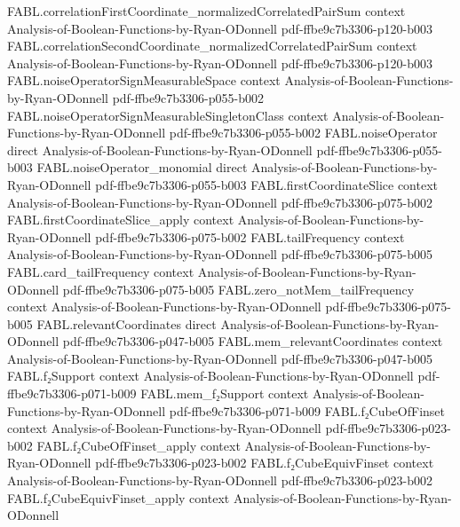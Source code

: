 \begin{theorem}
\proofstep
  {FABL.correlationFirstCoordinate_normalizedCorrelatedPairSum}
  {context}
  {Analysis-of-Boolean-Functions-by-Ryan-ODonnell}
  {pdf-ffbe9c7b3306-p120-b003}
\proofstep
  {FABL.correlationSecondCoordinate_normalizedCorrelatedPairSum}
  {context}
  {Analysis-of-Boolean-Functions-by-Ryan-ODonnell}
  {pdf-ffbe9c7b3306-p120-b003}
\proofstep
  {FABL.noiseOperatorSignMeasurableSpace}
  {context}
  {Analysis-of-Boolean-Functions-by-Ryan-ODonnell}
  {pdf-ffbe9c7b3306-p055-b002}
\proofstep
  {FABL.noiseOperatorSignMeasurableSingletonClass}
  {context}
  {Analysis-of-Boolean-Functions-by-Ryan-ODonnell}
  {pdf-ffbe9c7b3306-p055-b002}
\proofstep
  {FABL.noiseOperator}
  {direct}
  {Analysis-of-Boolean-Functions-by-Ryan-ODonnell}
  {pdf-ffbe9c7b3306-p055-b003}
\proofstep
  {FABL.noiseOperator_monomial}
  {direct}
  {Analysis-of-Boolean-Functions-by-Ryan-ODonnell}
  {pdf-ffbe9c7b3306-p055-b003}
\proofstep
  {FABL.firstCoordinateSlice}
  {context}
  {Analysis-of-Boolean-Functions-by-Ryan-ODonnell}
  {pdf-ffbe9c7b3306-p075-b002}
\proofstep
  {FABL.firstCoordinateSlice_apply}
  {context}
  {Analysis-of-Boolean-Functions-by-Ryan-ODonnell}
  {pdf-ffbe9c7b3306-p075-b002}
\proofstep
  {FABL.tailFrequency}
  {context}
  {Analysis-of-Boolean-Functions-by-Ryan-ODonnell}
  {pdf-ffbe9c7b3306-p075-b005}
\proofstep
  {FABL.card_tailFrequency}
  {context}
  {Analysis-of-Boolean-Functions-by-Ryan-ODonnell}
  {pdf-ffbe9c7b3306-p075-b005}
\proofstep
  {FABL.zero_notMem_tailFrequency}
  {context}
  {Analysis-of-Boolean-Functions-by-Ryan-ODonnell}
  {pdf-ffbe9c7b3306-p075-b005}
\proofstep
  {FABL.relevantCoordinates}
  {direct}
  {Analysis-of-Boolean-Functions-by-Ryan-ODonnell}
  {pdf-ffbe9c7b3306-p047-b005}
\proofstep
  {FABL.mem_relevantCoordinates}
  {context}
  {Analysis-of-Boolean-Functions-by-Ryan-ODonnell}
  {pdf-ffbe9c7b3306-p047-b005}
\proofstep
  {FABL.f₂Support}
  {context}
  {Analysis-of-Boolean-Functions-by-Ryan-ODonnell}
  {pdf-ffbe9c7b3306-p071-b009}
\proofstep
  {FABL.mem_f₂Support}
  {context}
  {Analysis-of-Boolean-Functions-by-Ryan-ODonnell}
  {pdf-ffbe9c7b3306-p071-b009}
\proofstep
  {FABL.f₂CubeOfFinset}
  {context}
  {Analysis-of-Boolean-Functions-by-Ryan-ODonnell}
  {pdf-ffbe9c7b3306-p023-b002}
\proofstep
  {FABL.f₂CubeOfFinset_apply}
  {context}
  {Analysis-of-Boolean-Functions-by-Ryan-ODonnell}
  {pdf-ffbe9c7b3306-p023-b002}
\proofstep
  {FABL.f₂CubeEquivFinset}
  {context}
  {Analysis-of-Boolean-Functions-by-Ryan-ODonnell}
  {pdf-ffbe9c7b3306-p023-b002}
\proofstep
  {FABL.f₂CubeEquivFinset_apply}
  {context}
  {Analysis-of-Boolean-Functions-by-Ryan-ODonnell}

\end{theorem}
